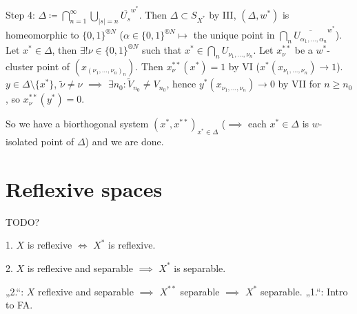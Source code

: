 \documentclass[12pt]{article}					%
\begin{document}
\begin{veta}
\begin{dukazin}
		Step 4: $Δ \coloneq \bigcap_{n=1}^∞ \bigcup_{|s| = n} \overline{U_s}^{w^*}$. Then $Δ \subset S_{X^*}$ by III, $(Δ, w^*)$ is homeomorphic to $\{0, 1\}^{®N}$ ($α \in \{0, 1\}^{®N} \mapsto$ the unique point in $\bigcap_n \overline{U_{α_1, …, α_n}}^{w^*}$). Let $x^* \in Δ$, then $\exists! ν \in \{0, 1\}^{®N}$ such that $x^* \in \bigcap_n U_{ν_1, …, ν_n}$. Let $x^{**}_ν$ be a $w^*$-cluster point of $(x_{(ν_1, …, ν_n)_n})$. Then $x_ν^{**}(x^*) = 1$ by VI ($x^*(x_{ν_1, …, ν_n}) \rightarrow 1$). $y \in Δ \setminus \{x^*\}$, $\tilde ν ≠ ν$ $\implies$ $\exists n_0: \tilde V_{n_0} ≠ V_{n_0}$, hence $y^*(x_{ν_1, …, ν_n}) \rightarrow 0$ by VII for $n ≥ n_0$, so $x_ν^{**}(y^*) = 0$.

		So we have a biorthogonal system $(x^*, x^{**})_{x^* \in Δ}$ ($\implies$ each $x^* \in Δ$ is $w$-isolated point of $Δ$) and we are done.
	\end{dukazin}
\end{veta}

\section{Reflexive spaces}
TODO?

\begin{tvrzeni}
	1. $X$ is reflexive $\Leftrightarrow$ $X^*$ is reflexive.

	2. $X$ is reflexive and separable $\implies$ $X^*$ is separable.

	\begin{dukazin}
		„2.“: $X$ reflexive and separable $\implies$ $X^{**}$ separable $\implies$ $X^*$ separable. „1.“: Intro to FA.
	\end{dukazin}
\end{tvrzeni}
\end{document}
